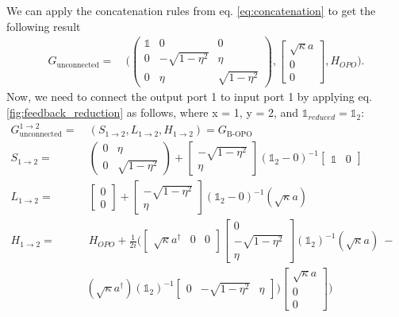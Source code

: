 \documentclass[a4paper]{article}
\begin{document}
We can apply the concatenation rules from eq. \ref{eq:concatenation} to get the following result
\begin{align*}
     G_{\text{unconnected}} = & \ \Bigg( \begin{pmatrix} \mathbb{1} & 0 & 0 \\ 0 & -\sqrt{1-\eta^2} & \eta \\ 0 & \eta & \sqrt{1-\eta^2}  \end{pmatrix},\begin{bmatrix} \sqrt{\kappa}a \\ 0 \\ 0 \end{bmatrix}, H_{OPO} \Bigg).
\end{align*}
Now, we need to connect the output port 1 to input port 1 by applying eq. \ref{fig:feedback_reduction} as follows, where x = 1, y = 2, and $\mathbb{1}_{reduced} = \mathbb{1}_2$: 
\begin{align*}
    G_{\text{unconnected}}^{1 \rightarrow 2} = & \ (S_{1 \rightarrow 2}, L_{1 \rightarrow 2}, H_{1 \rightarrow 2}) =  G_{\text{B-OPO}} &  \\
    S_{1 \rightarrow 2} = & \ \begin{pmatrix}  0 & \eta \\ 0 & \sqrt{1-\eta^2}  \end{pmatrix} + \begin{bmatrix}  -\sqrt{1-\eta^2} \\ \eta \end{bmatrix} (\mathbb{1}_2-0)^{-1} \begin{bmatrix} \mathbb{1}  & 0 \end{bmatrix} & \\
    L_{1 \rightarrow 2} = & \ \begin{bmatrix}  0 \\ 0 \end{bmatrix} + \begin{bmatrix}  -\sqrt{1-\eta^2} \\ \eta \end{bmatrix} (\mathbb{1}_2-0)^{-1}(\sqrt{\kappa}a) & \\
    H_{1 \rightarrow 2} = & \ H_{OPO} + \frac{1}{2i}\Bigg( \begin{bmatrix} \sqrt{\kappa}a^\dagger  & 0 & 0 \end{bmatrix} \begin{bmatrix} 0   \\  -\sqrt{1-\eta^2} \\ \eta \end{bmatrix}  (\mathbb{1}_2)^{-1}(\sqrt{\kappa}a) \ - &  
    \\ &  (\sqrt{\kappa}a^\dagger) (\mathbb{1}_2)^{-1} \begin{bmatrix} 0  &  - \sqrt{1-\eta^2} & \eta \end{bmatrix} ) \begin{bmatrix} \sqrt{\kappa}a \\ 0 \\ 0 \end{bmatrix} \Bigg)
\end{align*}
\end{document}
